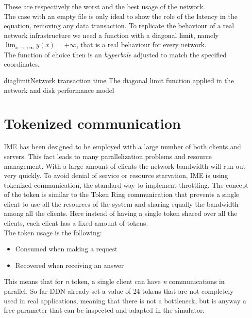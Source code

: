 These are respectively the worst and the best usage of the network. \\
The case with an empty file is only ideal to show the role of the latency in the
equation, removing any data transaction.
To replicate the behaviour of a real network infrastructure we need a function
with a diagonal limit, namely $\lim_{x \to +\infty} y(x) = +\infty$,
that is a real behaviour for every network. \\
The function of choice then is an \textit{hyperbole} adjusted to match the
specified coordinates. \\
\begin{myimage}{diaglimit}{Network transaction time}
    The diagonal limit function applied in the network and disk performance model
\end{myimage}


\section{Tokenized communication}
IME has been designed to be employed with a large number of both clients and
servers. This fact leads to many parallelization problems and resource management.
With a large amount of clients the network bandwidth will run out very quickly.
To avoid denial of service or resource starvation, IME is using tokenized
communication, the standard way to implement throttling. The concept of the
token is similar to the Token Ring communication \cite{token-ring} that prevents
a single client to use all the resources of the system and sharing equally the
bandwidth among all the clients.  Here instead of having a single token shared
over all the clients, each client has a fixed amount of tokens.\\
The token usage is the following:
\begin{itemize}
    \item Consumed when making a request
    \item Recovered when receiving an answer
\end{itemize}
This means that for \textit{n} token, a single client can have \textit{n}
communications in parallel.  So far DDN already set a value of 24 tokens that
are not completely used in real applications, meaning that there is not a
bottleneck, but is anyway a free parameter that can be inspected and adapted in
the simulator.



